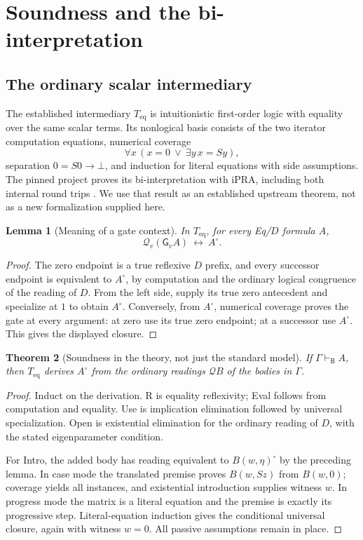\documentclass[11pt]{article}
\newtheorem{theorem}{Theorem}[section]
\newtheorem{lemma}[theorem]{Lemma}
\theoremstyle{definition}
\theoremstyle{remark}
\newcommand{\Bprf}{\mathsf{B}}
\newcommand{\Teq}{T_{\mathrm{eq}}}
\newcommand{\gate}{\mathsf{G}}
\newcommand{\entB}{\vdash_{\Bprf}}
\begin{document}
\section{Soundness and the bi-interpretation}
\label{sec:bi}

\subsection{The ordinary scalar intermediary}

The established intermediary $\Teq$ is intuitionistic first-order logic
with equality over the same scalar terms. Its nonlogical basis consists
of the two iterator computation equations, numerical coverage
\[
 \forall x\,(x=0\ \lor\ \exists y\,x=Sy),
\]
separation $0=S0\to\bot$, and induction for literal equations with
side assumptions. The pinned project proves its bi-interpretation with
iPRA, including both internal round trips \cite{scalarbridge}.
We use that result as an established upstream theorem, not as a new
formalization supplied here.

\begin{lemma}[Meaning of a gate context]
In $\Teq$, for every Eq/$D$ formula $A$,
\[
                  \mathcal Q_v(\gate_v A)\ \longleftrightarrow\ A^\circ.
                  \tag{Assumption}
\]
\end{lemma}
\begin{proof}
The zero endpoint is a true reflexive $D$ prefix, and every successor
endpoint is equivalent to $A^\circ$, by computation and the ordinary
logical congruence of the reading of $D$.
From the left side, supply its true zero antecedent and specialize at
$1$ to obtain $A^\circ$. Conversely, from $A^\circ$, numerical coverage
proves the gate at every argument: at zero use its true zero endpoint;
at a successor use $A^\circ$. This gives the displayed closure.
\end{proof}

\begin{theorem}[Soundness in the theory, not just the standard model]
If $\Gamma\entB A$, then $\Teq$ derives $A^\circ$ from the ordinary
readings $\mathcal Q B$ of the bodies in $\Gamma$.
\end{theorem}
\begin{proof}
Induct on the derivation. R is equality reflexivity; Eval follows from
computation and equality. Use is implication elimination followed by
universal specialization. Open is existential elimination for the
ordinary reading of $D$, with the stated eigenparameter condition.

For Intro, the added body has reading equivalent to $B(w,\eta)^\circ$
by the preceding lemma. In case mode the translated premise proves
$B(w,Sz)$ from $B(w,0)$; coverage yields all instances, and existential
introduction supplies witness $w$. In progress mode the matrix is a
literal equation and the premise is exactly its progressive step.
Literal-equation induction gives the conditional universal closure,
again with witness $w=0$. All passive assumptions remain in place.
\end{proof}
\end{document}
